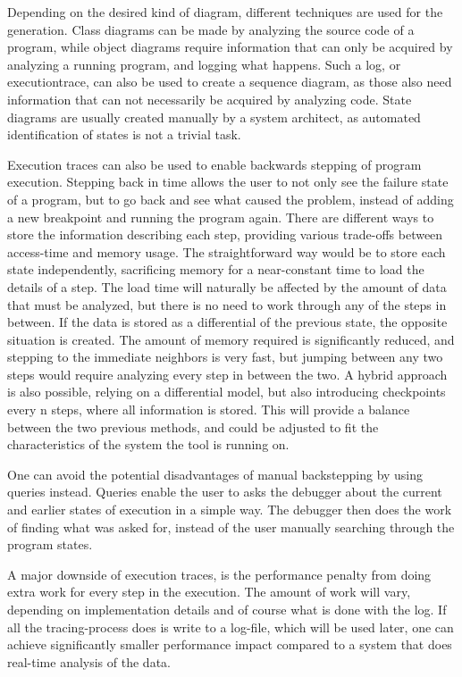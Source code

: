 Depending on the desired kind of diagram, different techniques are used for the generation.
Class diagrams can be made by analyzing the source code of a program, while object diagrams require information that can only be acquired by analyzing a running program, and logging what happens.
Such a log, or \gls{executiontrace}, can also be used to create a sequence diagram, as those also need information that can not necessarily be acquired by analyzing code.
State diagrams are usually created manually by a system architect, as automated identification of states is not a trivial task.

Execution traces can also be used to enable backwards stepping of program execution.
Stepping back in time allows the user to not only see the failure state of a program, but to go back and see what caused the problem, instead of adding a new \gls{breakpoint} and running the program again.
There are different ways to store the information describing each step, providing various trade-offs between access-time and memory usage.
The straightforward way would be to store each state independently, sacrificing memory for a near-constant time to load the details of a step.
The load time will naturally be affected by the amount of data that must be analyzed, but there is no need to work through any of the steps in between.
If the data is stored as a differential of the previous state, the opposite situation is created.
The amount of memory required is significantly reduced, and stepping to the immediate neighbors is very fast, but jumping between any two steps would require analyzing every step in between the two.
A hybrid approach is also possible, relying on a differential model, but also introducing checkpoints every n steps, where all information is stored.
This will provide a balance between the two previous methods, and could be adjusted to fit the characteristics of the system the tool is running on.

One can avoid the potential disadvantages of manual backstepping by using queries instead.
Queries enable the user to asks the debugger about the current and earlier states of execution in a simple way.
The debugger then does the work of finding what was asked for, instead of the user manually searching through the program states.

A major downside of execution traces, is the performance penalty from doing extra work for every step in the execution.
The amount of work will vary, depending on implementation details and of course what is done with the log.
If all the tracing-process does is write to a log-file, which will be used later, one can achieve significantly smaller performance impact compared to a system that does real-time analysis of the data.

